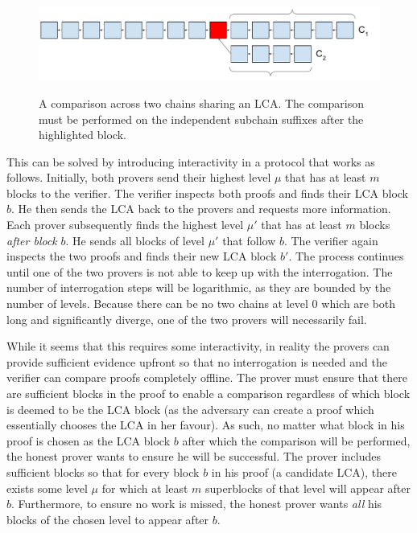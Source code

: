 \begin{figure}[ht]
    \caption{A comparison across two chains sharing an LCA. The comparison must
    be performed on the independent subchain suffixes after the highlighted block.}
    \centering
    \includegraphics[width=0.9\columnwidth,keepaspectratio]{../chapters/introduction/figures/lca-comparison.pdf}
    \label{fig.lca-comparison}
\end{figure}

This can be solved by introducing interactivity in a protocol that works as
follows. Initially, both provers send their highest level $\mu$ that has at
least $m$ blocks to the verifier. The verifier inspects both proofs and finds
their LCA block $b$. He then sends the LCA back to the provers and requests more
information. Each prover subsequently finds the highest level $\mu'$ that has at
least $m$ blocks \emph{after block} $b$. He sends all blocks of level $\mu'$ that
follow $b$. The verifier again inspects the two
proofs and finds their new LCA block $b'$. The process continues until one of the
two provers is not able to keep up with the interrogation. The number of
interrogation steps will be logarithmic, as they are bounded by the number of
levels. Because there can be
no two chains at level $0$ which are both long and significantly diverge, one of
the two provers will necessarily fail.

While it seems that this requires some interactivity, in reality the provers can
provide sufficient evidence upfront so that no interrogation is needed and the verifier can compare proofs
completely
offline. The prover must ensure that there are sufficient blocks in the proof to
enable a comparison regardless of which block is deemed to be the LCA block (as
the adversary can create a proof which essentially chooses the LCA in her
favour). As such, no matter what block in his proof is chosen as the LCA block
$b$ after which the comparison will be performed, the honest prover wants to
ensure he will be successful. The prover includes sufficient blocks so that for
every block $b$ in his proof (a candidate LCA), there exists some level $\mu$
for which at least $m$ superblocks of that level will appear after $b$.
Furthermore, to ensure no work is missed, the honest prover wants \emph{all} his
blocks of the chosen level to appear after $b$.

